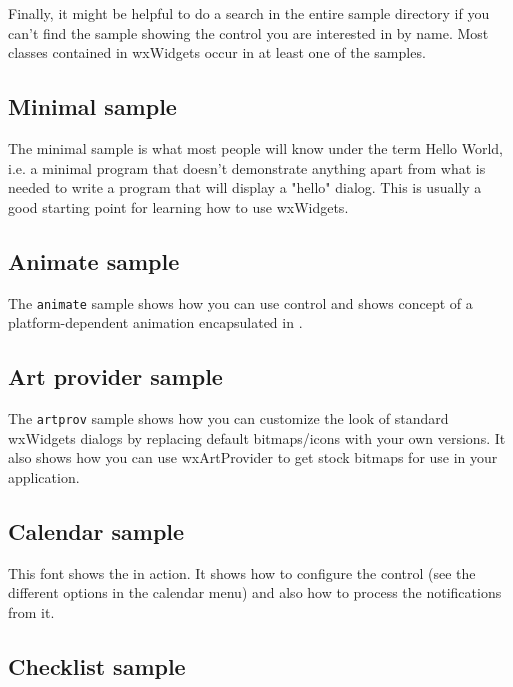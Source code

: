 Finally, it might be helpful to do a search in the entire sample directory if
you can't find the sample showing the control you are interested in by
name. Most classes contained in wxWidgets occur in at least one of the samples.


\subsection{Minimal sample}\label{sampleminimal}

The minimal sample is what most people will know under the term Hello World,
i.e. a minimal program that doesn't demonstrate anything apart from what is
needed to write a program that will display a "hello" dialog. This is usually
a good starting point for learning how to use wxWidgets.


\subsection{Animate sample}\label{sampleanimate}

The {\tt animate} sample shows how you can use 
control and shows concept of a platform-dependent animation encapsulated
in .


\subsection{Art provider sample}\label{sampleartprovider}

The {\tt artprov} sample shows how you can customize the look of standard
wxWidgets dialogs by replacing default bitmaps/icons with your own versions.
It also shows how you can use wxArtProvider to
get stock bitmaps for use in your application.


\subsection{Calendar sample}\label{samplecalendar}

This font shows the  in action. It
shows how to configure the control (see the different options in the calendar
menu) and also how to process the notifications from it.


\subsection{Checklist sample}\label{samplechecklist}

